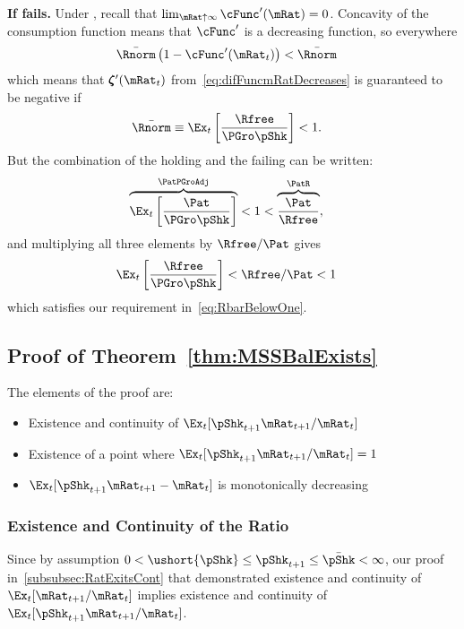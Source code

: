 \documentclass[\econtexRoot/BufferStockTheory]{subfiles}
\begin{document}
\textbf{If {\RIC} fails.}
Under \cncl{\RIC}, recall that $\lim_{\mRat \uparrow \infty} \cFunc^{\prime}(\mRat) = 0$.  Concavity of the consumption function means that $\cFunc^{\prime}$ is a decreasing function, so everywhere 
\begin{align*}
  \bar{\Rnorm}\left(1-\cFunc^{\prime}({\mRat}_t)\right) & < \bar{\Rnorm}
\end{align*}
which means that $\difFunc^{\prime}(\mRat_{t})$ from~\eqref{eq:difFuncmRatDecreases} is guaranteed to be negative if
\begin{align}
  \bar{\Rnorm} \equiv \Ex_{t}\left[\frac{\Rfree}{\PGro \pShk}\right] & < 1  \label{eq:RbarBelowOne}.
\end{align}
But the combination of the {\GICNrm} holding and the {\RIC} failing can be written:
\begin{align*}
  \overbrace{\Ex_{t}\left[\frac{\Pat}{\PGro \pShk}\right]}^{\PatPGroAdj} & < 1 < \overbrace{\frac{\Pat}{\Rfree}}^{{\PatR}},
\end{align*}
and multiplying all three elements by $\Rfree/\Pat$ gives 
\begin{align*}
  \Ex_{t}\left[\frac{\Rfree}{\PGro \pShk}\right] & < \Rfree/\Pat < 1
\end{align*}
which satisfies our requirement in~\eqref{eq:RbarBelowOne}.

  
\subsection{Proof of Theorem~\ref{thm:MSSBalExists}}

The elements of the proof are:
\begin{itemize}
\item Existence and continuity of $\Ex_{t}[\pShk_{t+1}\mRat_{t+1}/\mRat_t]$
\item Existence of a point where $\Ex_{t}[\pShk_{t+1}\mRat_{t+1}/\mRat_t] = 1$
\item $\Ex_{t}[\pShk_{t+1}\mRat_{t+1}-\mRat_{t}]$ is monotonically decreasing
\end{itemize}

\subsubsection{Existence and Continuity of the Ratio}%

Since by assumption $ 0 < \ushort{\pShk} \leq \pShk_{t+1} \leq \bar{\pShk} < \infty$, our proof in~\ref{subsubsec:RatExitsCont} that demonstrated existence and continuity of $\Ex_{t}[\mRat_{t+1}/\mRat_{t}]$ implies existence and continuity of $\Ex_{t}[\pShk_{t+1}\mRat_{t+1}/\mRat_{t}]$.
\end{document}
